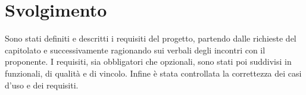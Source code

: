 \section{Svolgimento}

Sono stati definiti e descritti i requisiti del progetto, partendo dalle richieste del capitolato e successivamente ragionando sui verbali degli incontri con il proponente. I requisiti, sia obbligatori che opzionali, sono stati poi suddivisi in funzionali, di qualità e di vincolo. Infine è stata controllata la correttezza dei casi d'uso e dei requisiti.